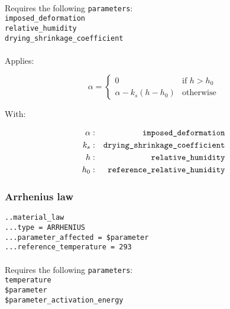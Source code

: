 \documentclass[10pt]{article}
\begin{document}
\paragraph{}Requires the following \verb+parameters+:\\

\noindent \verb+imposed_deformation+\\
\verb+relative_humidity+\\
\verb+drying_shrinkage_coefficient+

\paragraph{}Applies:

\begin{equation}
	\alpha = \left\{ \begin{array}{cl} 0 & \text{if } h > h_0 \\ \alpha - k_s ( h - h_0 ) & \text{otherwise} \end{array} \right.
\end{equation}

With:

\begin{eqnarray}
	\alpha & : & \verb+imposed_deformation+ \notag \\
	k_s & : & \verb+drying_shrinkage_coefficient+\notag  \\
	h & : & \verb+relative_humidity+ \notag \\
	h_0 & : & \verb+reference_relative_humidity+ \notag 
\end{eqnarray}

\subsubsection{Arrhenius law}

\noindent \verb+..material_law+\\
\verb+...type = ARRHENIUS+\\
\verb+...parameter_affected = $parameter+\\
\verb+...reference_temperature = 293+

\paragraph{}Requires the following \verb+parameters+:\\

\noindent \verb+temperature+\\
\verb+$parameter+\\
\verb+$parameter_activation_energy+
\end{document}
